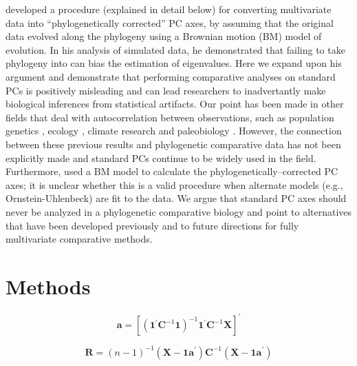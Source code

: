 \documentclass[a4paper,12pt]{article}
\begin{document}
\citet{Revell} developed a procedure (explained in detail below) for converting multivariate data into ``phylogenetically corrected'' PC axes, by assuming that the original data evolved along the phylogeny using a Brownian motion (BM) model of evolution. In his analysis of simulated data, he demonstrated that failing to take phylogeny into can bias the estimation of eigenvalues. Here we expand upon his argument and demonstrate that performing comparative analyses on standard PCs is positively misleading and can lead researchers to inadvertantly make biological inferences from statistical artifacts. Our point has been made in other fields that deal with autocorrelation between observations, such as population genetics \citep{Novembre}, ecology \citep{Podani2002}, climate research \citep{Richman1986} and paleobiology \citep{Bookstein2012}. However, the connection between these previous results and phylogenetic comparative data has not been explicitly made and standard PCs continue to be widely used in the field. Furthermore, \citet{Revell} used a BM model to calculate the phylogenetically--corrected PC axes; it is unclear whether this is a valid procedure when alternate models (e.g., Ornstein-Uhlenbeck) are fit to the data. We argue that standard PC axes should never be analyzed in a phylogenetic comparative biology and point to alternatives that have been developed previously and to future directions for fully multivariate comparative methods.

\section{Methods}
\begin{equation}
\mathbf{a}=[(\mathbf{1}^\prime \mathbf{C}^{-1} \mathbf{1})^{-1} 
\mathbf{1}^\prime \mathbf{C}^{-1} \mathbf{X}]^\prime
\end{equation}

\begin{equation}
\mathbf{R} = (n-1)^{-1} (\mathbf{X} - \mathbf{1a}^\prime ) \mathbf{C}^{-1} 
(\mathbf{X} - \mathbf{1a}^\prime )
\end{equation}
\end{document}

